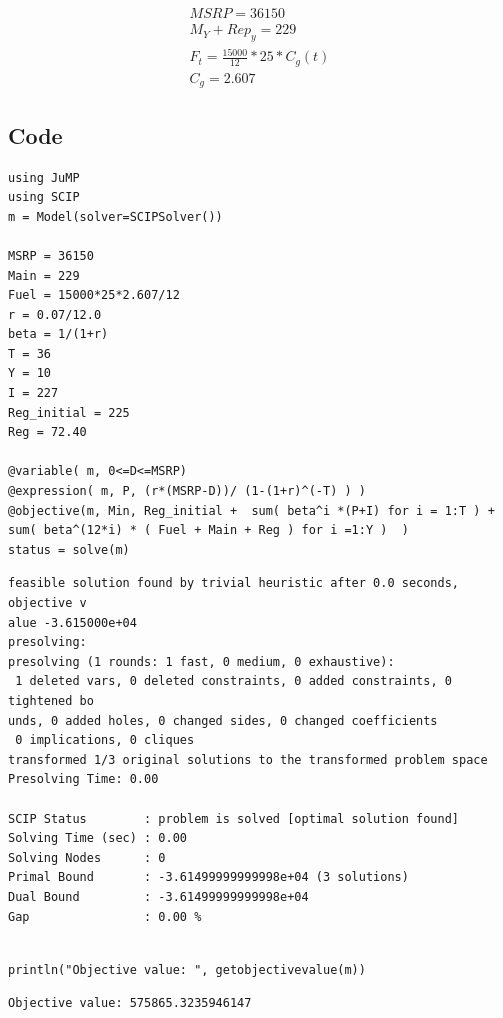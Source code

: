 \documentclass[10pt]{paper}
\begin{document}
\begin{align*}
  MSRP = 36150\\
  M_Y + Rep_y = 229\\
  F_t = \frac{15000}{12}*25*C_g(t)\\
  C_g = 2.607
\end{align*}

\subsection*{Code}
\begin{verbatim}
using JuMP
using SCIP
m = Model(solver=SCIPSolver())

MSRP = 36150
Main = 229
Fuel = 15000*25*2.607/12
r = 0.07/12.0
beta = 1/(1+r)
T = 36
Y = 10
I = 227
Reg_initial = 225
Reg = 72.40

@variable( m, 0<=D<=MSRP)
@expression( m, P, (r*(MSRP-D))/ (1-(1+r)^(-T) ) )
@objective(m, Min, Reg_initial +  sum( beta^i *(P+I) for i = 1:T ) + sum( beta^(12*i) * ( Fuel + Main + Reg ) for i =1:Y )  )
status = solve(m)
\end{verbatim}
\begin{verbatim}
feasible solution found by trivial heuristic after 0.0 seconds, objective v
alue -3.615000e+04
presolving:
presolving (1 rounds: 1 fast, 0 medium, 0 exhaustive):
 1 deleted vars, 0 deleted constraints, 0 added constraints, 0 tightened bo
unds, 0 added holes, 0 changed sides, 0 changed coefficients
 0 implications, 0 cliques
transformed 1/3 original solutions to the transformed problem space
Presolving Time: 0.00

SCIP Status        : problem is solved [optimal solution found]
Solving Time (sec) : 0.00
Solving Nodes      : 0
Primal Bound       : -3.61499999999998e+04 (3 solutions)
Dual Bound         : -3.61499999999998e+04
Gap                : 0.00 %
\end{verbatim}

\begin{verbatim}

println("Objective value: ", getobjectivevalue(m))
\end{verbatim}
\begin{verbatim}
Objective value: 575865.3235946147
\end{verbatim}
\end{document}
